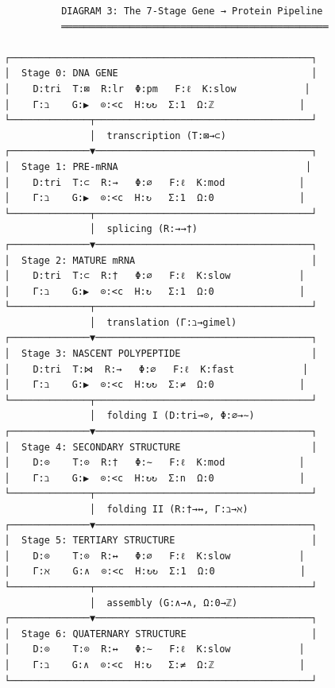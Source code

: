 \documentclass[12pt,a4paper]{article}
\begin{document}
\begin{verbatim}
                    DIAGRAM 3: The 7-Stage Gene → Protein Pipeline
                    ═══════════════════════════════════════════════

          ┌─────────────────────────────────────────────────────┐
          │  Stage 0: DNA GENE                                  │
          │    D:tri  T:⊠  R:lr  Φ:pm   F:ℓ  K:slow            │
          │    Γ:ℶ    G:▶  ⊙:<c  H:↻↻  Σ:1  Ω:ℤ               │
          └──────────────┬──────────────────────────────────────┘
                         │  transcription (T:⊠→⊂)
          ┌──────────────▼──────────────────────────────────────┐
          │  Stage 1: PRE-mRNA                                 │
          │    D:tri  T:⊂  R:→   Φ:∅   F:ℓ  K:mod             │
          │    Γ:ℶ    G:▶  ⊙:<c  H:↻   Σ:1  Ω:0               │
          └──────────────┬──────────────────────────────────────┘
                         │  splicing (R:→→†)
          ┌──────────────▼──────────────────────────────────────┐
          │  Stage 2: MATURE mRNA                               │
          │    D:tri  T:⊂  R:†   Φ:∅   F:ℓ  K:slow            │
          │    Γ:ℶ    G:▶  ⊙:<c  H:↻   Σ:1  Ω:0               │
          └──────────────┬──────────────────────────────────────┘
                         │  translation (Γ:ℶ→gimel)
          ┌──────────────▼──────────────────────────────────────┐
          │  Stage 3: NASCENT POLYPEPTIDE                       │
          │    D:tri  T:⋈  R:→   Φ:∅   F:ℓ  K:fast            │
          │    Γ:ℶ    G:▶  ⊙:<c  H:↻↻  Σ:≠  Ω:0               │
          └──────────────┬──────────────────────────────────────┘
                         │  folding I (D:tri→⊙, Φ:∅→∼)
          ┌──────────────▼──────────────────────────────────────┐
          │  Stage 4: SECONDARY STRUCTURE                       │
          │    D:⊙    T:⊙  R:†   Φ:∼   F:ℓ  K:mod             │
          │    Γ:ℶ    G:▶  ⊙:<c  H:↻↻  Σ:n  Ω:0               │
          └──────────────┬──────────────────────────────────────┘
                         │  folding II (R:†→↔, Γ:ℶ→ℵ)
          ┌──────────────▼──────────────────────────────────────┐
          │  Stage 5: TERTIARY STRUCTURE                        │
          │    D:⊙    T:⊙  R:↔   Φ:∅   F:ℓ  K:slow            │
          │    Γ:ℵ    G:∧  ⊙:<c  H:↻↻  Σ:1  Ω:0               │
          └──────────────┬──────────────────────────────────────┘
                         │  assembly (G:∧→∧, Ω:0→ℤ)
          ┌──────────────▼──────────────────────────────────────┐
          │  Stage 6: QUATERNARY STRUCTURE                      │
          │    D:⊙    T:⊙  R:↔   Φ:∼   F:ℓ  K:slow            │
          │    Γ:ℶ    G:∧  ⊙:<c  H:↻   Σ:≠  Ω:ℤ               │
          └─────────────────────────────────────────────────────┘
\end{verbatim}
\end{document}
